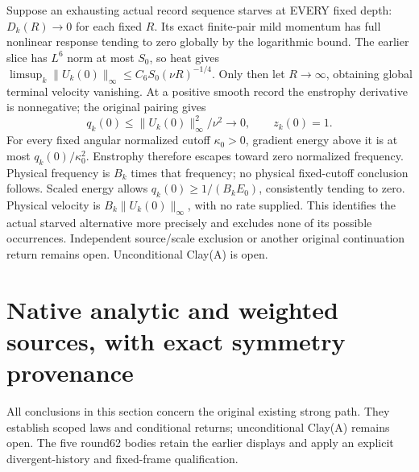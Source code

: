 \documentclass[11pt]{article}
\begin{document}
Suppose an exhausting actual record sequence starves at EVERY fixed depth:
$D_k(R)\to0$ for each fixed $R$. Its exact finite-pair mild momentum has
full nonlinear response tending to zero globally by the logarithmic bound.
The earlier slice has $L^6$ norm at most $S_0$, so heat gives
$\limsup_k\|U_k(0)\|_\infty\le C_6S_0(\nu R)^{-1/4}$.
Only then let $R\to\infty$, obtaining global terminal velocity vanishing.
At a positive smooth record the enstrophy derivative is nonnegative;
the original pairing gives
\[
 q_k(0)\le\|U_k(0)\|_\infty^2/\nu^2\longrightarrow0,
 \qquad z_k(0)=1.
\]
For every fixed angular normalized cutoff $\kappa_0>0$, gradient energy
above it is at most $q_k(0)/\kappa_0^2$. Enstrophy therefore escapes
toward zero normalized frequency. Physical frequency is $B_k$ times that
frequency; no physical fixed-cutoff conclusion follows. Scaled energy
allows $q_k(0)\ge1/(B_kE_0)$, consistently tending to zero. Physical
velocity is $B_k\|U_k(0)\|_\infty$, with no rate supplied. This identifies
the actual starved alternative more precisely and excludes none of its
possible occurrences. Independent source/scale exclusion or another
original continuation return remains open. Unconditional Clay(A) is open.

\section{Native analytic and weighted sources, with exact symmetry provenance}
\label{sec:native-analytic-symmetry}

All conclusions in this section concern the original existing strong path.
They establish scoped laws and conditional returns; unconditional Clay(A)
remains open. The five round62 bodies retain the earlier displays and apply
an explicit divergent-history and fixed-frame qualification.
\end{document}
